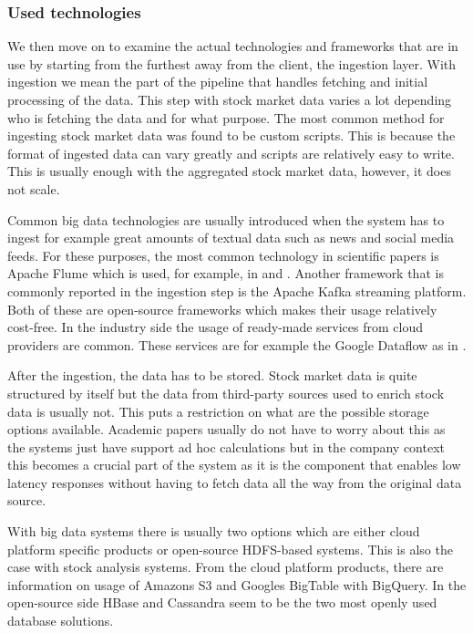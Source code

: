 \subsubsection{Used technologies}

We then move on to examine the actual technologies and frameworks that are in use by starting from the furthest away from the client, the ingestion layer.
With ingestion we mean the part of the pipeline that handles fetching and initial processing of the data.
This step with stock market data varies a lot depending who is fetching the data and for what purpose.
The most common method for ingesting stock market data was found to be custom scripts.
This is because the format of ingested data can vary greatly and scripts are relatively easy to write.
This is usually enough with the aggregated stock market data, however, it does not scale.

Common big data technologies are usually introduced when the system has to ingest for example great amounts of textual data such as news and social media feeds.
For these purposes, the most common technology in scientific papers is Apache Flume which is used, for example, in \cite{peng} and \cite{das}.
Another framework that is commonly reported in the ingestion step is the Apache Kafka streaming platform. \cite{chungho} \cite{juan}
Both of these are open-source frameworks which makes their usage relatively cost-free.
In the industry side the usage of ready-made services from cloud providers are common.
These services are for example the Google Dataflow as in \cite{palmer}.

After the ingestion, the data has to be stored.
Stock market data is quite structured by itself but the data from third-party sources used to enrich stock data is usually not.
This puts a restriction on what are the possible storage options available.
Academic papers usually do not have to worry about this as the systems just have support ad hoc calculations but in the company context this becomes a crucial part of the system as it is the component that enables low latency responses without having to fetch data all the way from the original data source.

With big data systems there is usually two options which are either cloud platform specific products or open-source HDFS-based systems.
This is also the case with stock analysis systems.
From the cloud platform products, there are information on usage of Amazons S3 and Googles BigTable with BigQuery. \cite{snively} \cite{palmer}
In the open-source side HBase \cite{gu} and Cassandra seem to be the two most openly used database solutions.

